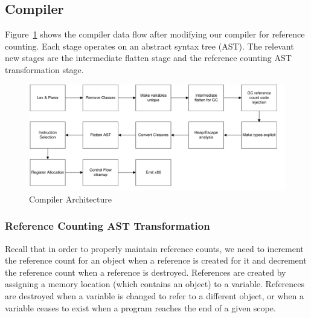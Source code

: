 \documentclass{sigplanconf}
\begin{document}
\subsection{Compiler}

Figure~\ref{fig-comparch} shows the compiler data flow after modifying our compiler for reference counting.  Each stage operates on an abstract syntax tree (AST).  The relevant new stages are the intermediate flatten stage and the reference counting AST transformation stage.  

\begin{figure}
\begin{center}
\includegraphics[scale=0.48]{compiler_flow.pdf}
\end{center}
\caption{Compiler Architecture}
\label{fig-comparch}
\end{figure}

\subsubsection{Reference Counting AST Transformation}

Recall that in order to properly maintain reference counts, we need to increment the reference count for an object when a reference is created for it and decrement the reference count when a reference is destroyed.  References are created by assigning a memory location (which contains an object) to a variable.  References are destroyed when a variable is changed to refer to a different object, or when a variable ceases to exist when a program reaches the end of a given scope.
\end{document}
